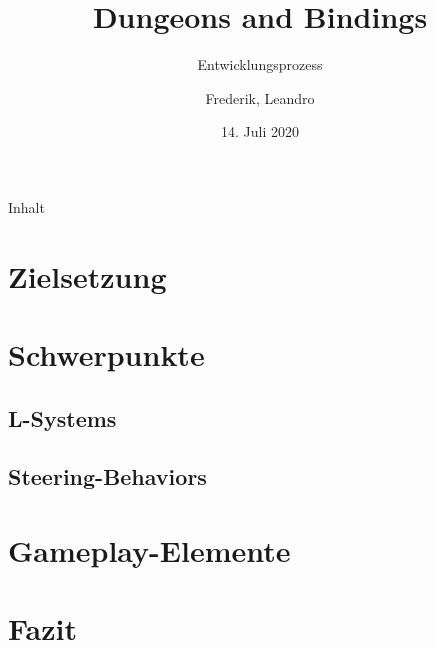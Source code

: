 \documentclass{beamer}
\title{Dungeons and Bindings}
\subtitle{Entwicklungsprozess}
\author{Frederik, Leandro}
\institute{TU Dortmund}
\date{14. Juli 2020}
\begin{document}
\begin{frame}
\titlepage
\end{frame}

\begin{frame}{Inhalt}
\tableofcontents
\end{frame}

\section{Zielsetzung}
%

\section{Schwerpunkte}

\subsection{L-Systems}
%

\subsection{Steering-Behaviors}
%

\section{Gameplay-Elemente}
%

\section{Fazit}
%
\end{document}
